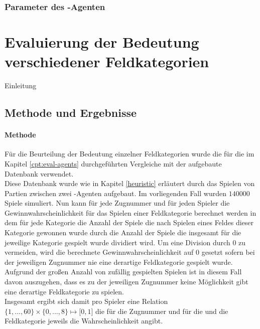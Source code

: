 \subsubsection*{Parameter des -Agenten}
\label{eval:agents:params:subsec-ab}


\section{Evaluierung der Bedeutung verschiedener Feldkategorien}
Einleitung
\subsection{Methode und Ergebnisse}
\paragraph{Methode}
Für die Beurteilung der Bedeutung einzelner Feldkategorien wurde die für die im Kapitel \ref{cpt:eval-agents} durchgeführten Vergleiche mit der  aufgebaute Datenbank verwendet.
\\Diese Datenbank wurde wie in Kapitel \ref{heuristic} erläutert durch das Spielen von Partien zwischen zwei -Agenten aufgebaut. Im vorliegenden Fall wurden $140000$ Spiele simuliert. Nun kann für jede Zugnummer und für jeden Spieler die Gewinnwahrscheinlichkeit für das Spielen einer Feldkategorie berechnet werden in dem für jede Kategorie die Anzahl der Spiele die nach Spielen eines Feldes dieser Kategorie gewonnen wurde durch die Anzahl der Spiele die insgesamt für die jeweilige Kategorie gespielt wurde dividiert wird. Um eine Division durch $0$ zu vermeiden, wird die berechnete Gewinnwahrscheinlichkeit auf $0$ gesetzt sofern bei der jeweiligen Zugnummer nie eine derartige Feldkategorie gespielt wurde. Aufgrund der großen Anzahl von zufällig gespielten Spielen ist in diesem Fall davon auszugehen, dass es zu der jeweiligen Zugnummer keine Möglichkeit gibt eine derartige Feldkategorie zu spielen. 
\\Insgesamt ergibt sich damit pro Spieler eine Relation $\lbrace1, ..., 60\rbrace\times\lbrace0, ..., 8\rbrace\mapsto\lbrack0,1\rbrack$ die für die Zugnummer und für die und die Feldkategorie jeweils die Wahrscheinlichkeit angibt.
  
